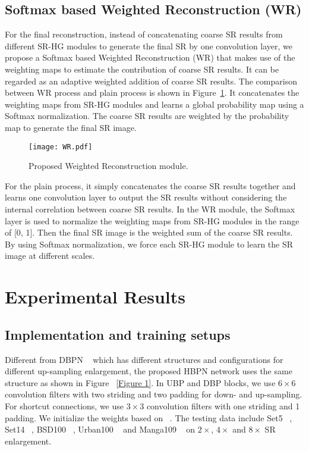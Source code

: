 \documentclass[10pt,twocolumn,letterpaper]{article}
\begin{document}
\subsection{Softmax based Weighted Reconstruction (WR)}
For the final reconstruction, instead of concatenating coarse SR results from different SR-HG modules to generate the final SR by one convolution layer, we propose a Softmax based Weighted Reconstruction (WR) that makes use of the weighting maps to estimate the contribution of coarse SR results. It can be regarded as an adaptive weighted addition of coarse SR results. The comparison between WR process and plain process is shown in Figure~\ref{Figure 5}. It concatenates the weighting maps from SR-HG modules and learns a global probability map using a Softmax normalization. The coarse SR results are weighted by the probability map to generate the final SR image.

\begin{figure}[htb]
\vskip 0.01in
\begin{center}
\centerline{\texttt{[image: WR.pdf]}}
\caption{Proposed Weighted Reconstruction module.}
\label{Figure 5}
\end{center}
\vskip -0.3in
\end{figure}

For the plain process, it simply concatenates the coarse SR results together and learns one convolution layer to output the SR results without considering the internal correlation between coarse SR results. In the WR module, the Softmax layer is used to normalize the weighting maps from SR-HG modules in the range of [0, 1]. Then the final SR image is the weighted sum of the coarse SR results. By using Softmax normalization, we force each SR-HG module to learn the SR image at different scales. 

\section{Experimental Results}

\subsection{Implementation and training setups}

Different from DBPN ~\cite{DBPN} which has different structures and configurations for different up-sampling enlargement, the proposed HBPN network uses the same structure as shown in Figure ~\ref{Figure 1}. In UBP and DBP blocks, we use $6\times6$ convolution filters with two striding and two padding for down- and up-sampling. For shortcut connections, we use $3\times3$ convolution filters with one striding and 1 padding. We initialize the weights based on ~\cite{PReLU}. The testing data include Set5 ~\cite{Set5}, Set14 ~\cite{Set14}, BSD100 ~\cite{BSD100}, Urban100 ~\cite{Urban100} and Manga109 ~\cite{Manga109} on $2\times$, $4\times$ and $8\times$ SR enlargement.
\end{document}
